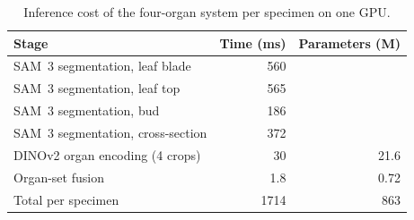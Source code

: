 \begin{table}[tbp]
\centering
\footnotesize
\caption{Inference cost of the four-organ system per specimen on one GPU.}
\label{tab:eff_organs}
\begin{tabular}{lrr}
\toprule
Stage & Time (ms) & Parameters (M) \\
\midrule
SAM~3 segmentation, leaf blade & 560 & \\
SAM~3 segmentation, leaf top & 565 & \\
SAM~3 segmentation, bud & 186 & \\
SAM~3 segmentation, cross-section & 372 & \\
DINOv2 organ encoding (4 crops) & 30 & 21.6 \\
Organ-set fusion & 1.8 & 0.72 \\
\midrule
Total per specimen & 1714 & 863 \\
\bottomrule
\end{tabular}
\end{table}